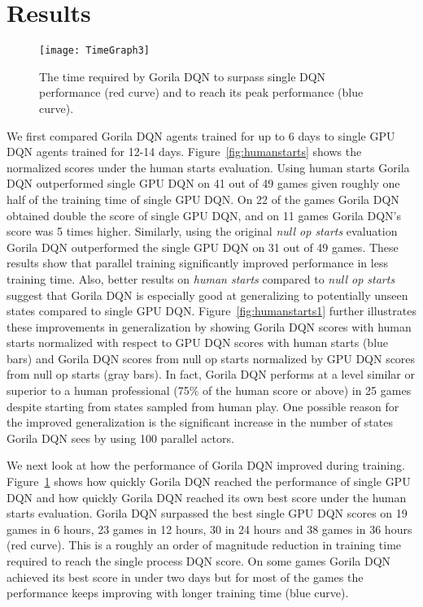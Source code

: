 \documentclass{article}
\begin{document}
 

\section {Results}

\begin{figure}[ht]
	\vskip -0.1in
	\begin{center}
		\centerline{\texttt{[image: TimeGraph3]}}
		\caption{
			The time required by Gorila DQN to surpass single DQN performance (red curve) and to reach its peak performance (blue curve). 
		}
		\label{fig:time}
	\end{center}
	\vskip -0.2in
\end{figure}

We first compared Gorila DQN agents trained for up to 6 days to single GPU DQN agents trained for 12-14 days.
Figure~\ref{fig:humanstarts} shows the normalized scores under the human starts evaluation.
Using human starts Gorila DQN outperformed single GPU DQN on 41 out of 49 games given roughly one half of the training time of single GPU DQN.
On 22 of the games Gorila DQN obtained double the score of single GPU DQN, and on 11 games Gorila DQN's score was 5 times higher.
Similarly, using the original {\it null op starts} evaluation  Gorila DQN outperformed the single GPU DQN on 31 out of 49 games. 
These results show that parallel training significantly improved performance in less training time. Also, better results on {\it human starts} compared to {\it null op starts} suggest that Gorila DQN is especially good at generalizing to potentially unseen states compared to single GPU DQN.  Figure~\ref{fig:humanstarts1} further illustrates these improvements in generalization by showing Gorila DQN scores with human starts normalized with respect to GPU DQN scores with human starts (blue bars) and Gorila DQN scores from null op starts normalized by GPU DQN scores from null op starts (gray bars).
In fact, Gorila DQN performs at a level similar or superior to a human professional (75\% of the human score or above) in 25 games despite starting from states sampled from human play.
One possible reason for the improved generalization is the significant increase in the number of states Gorila DQN sees by using 100 parallel actors.


We next look at how the performance of Gorila DQN improved during training.
Figure~\ref{fig:time} shows how quickly Gorila DQN reached the performance of single GPU DQN and how quickly Gorila DQN reached its own best score under the human starts evaluation.
Gorila DQN surpassed the best single GPU DQN scores on 19 games in 6 hours, 23 games in 12 hours, 30 in 24 hours and 38 games in 36 hours (red curve).
This is a roughly an order of magnitude reduction in training time required to reach the single process DQN score.
On some games Gorila DQN achieved its best score in under two days but for most of the games the performance keeps improving with longer training time (blue curve).
\end{document}
